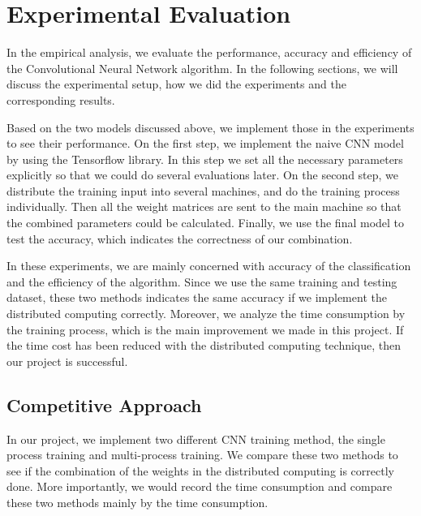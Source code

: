 
\section{Experimental Evaluation}
\label{Evaluation}

In the empirical analysis, we evaluate the performance, accuracy and efficiency of the Convolutional Neural Network algorithm. In the following sections, we will discuss the experimental setup, how we did the experiments and the corresponding results.

Based on the two models discussed above, we implement those in the experiments to see their performance. On the first step, we implement the naive CNN model by using the Tensorflow library. In this step we set all the necessary parameters explicitly so that we could do several evaluations later. On the second step, we distribute the training input into several machines, and do the training process individually.  Then all the weight matrices are sent to the main machine so that the combined parameters could be calculated.  Finally, we use the final model to test the accuracy, which indicates the correctness of our combination.

In these experiments, we are mainly concerned with accuracy of the classification and the efficiency of the algorithm. Since we use the same training and testing dataset, these two methods indicates the same accuracy if we implement the distributed computing correctly. Moreover, we analyze the time consumption by the training process, which is the main improvement we made in this project. If the time cost has been reduced with the distributed computing technique, then our project is successful.

\subsection{Competitive Approach}
\label{sec:competitive}
In our project, we implement two different CNN training method, the single process training and multi-process training. We compare these two methods to see if the combination of the weights in the distributed computing is correctly done. More importantly, we would record the time consumption and compare these two methods mainly by the time consumption.



